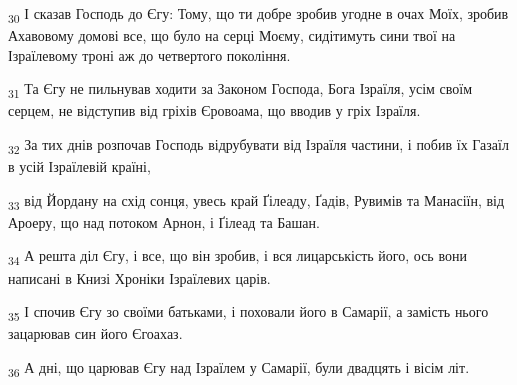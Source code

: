 \begin{tcolorbox}
\textsubscript{30} І сказав Господь до Єгу: Тому, що ти добре зробив угодне в очах Моїх, зробив Ахавовому домові все, що було на серці Моєму, сидітимуть сини твої на Ізраїлевому троні аж до четвертого покоління.
\end{tcolorbox}
\begin{tcolorbox}
\textsubscript{31} Та Єгу не пильнував ходити за Законом Господа, Бога Ізраїля, усім своїм серцем, не відступив від гріхів Єровоама, що вводив у гріх Ізраїля.
\end{tcolorbox}
\begin{tcolorbox}
\textsubscript{32} За тих днів розпочав Господь відрубувати від Ізраїля частини, і побив їх Газаїл в усій Ізраїлевій країні,
\end{tcolorbox}
\begin{tcolorbox}
\textsubscript{33} від Йордану на схід сонця, увесь край Ґілеаду, Ґадів, Рувимів та Манасіїн, від Ароеру, що над потоком Арнон, і Ґілеад та Башан.
\end{tcolorbox}
\begin{tcolorbox}
\textsubscript{34} А решта діл Єгу, і все, що він зробив, і вся лицарськість його, ось вони написані в Книзі Хроніки Ізраїлевих царів.
\end{tcolorbox}
\begin{tcolorbox}
\textsubscript{35} І спочив Єгу зо своїми батьками, і поховали його в Самарії, а замість нього зацарював син його Єгоахаз.
\end{tcolorbox}
\begin{tcolorbox}
\textsubscript{36} А дні, що царював Єгу над Ізраїлем у Самарії, були двадцять і вісім літ.
\end{tcolorbox}
